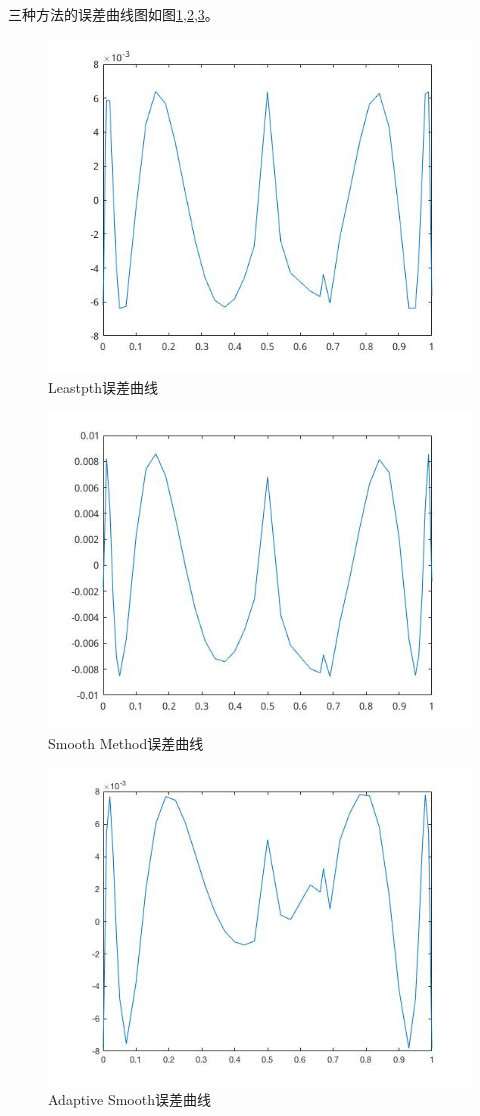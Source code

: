 \documentclass{ctexart}
\begin{document}
三种方法的误差曲线图如图\ref{fig:leastpth},\ref{fig:xusmooth},\ref{fig:adasmooth}。
\begin{figure}[htpb]
	\centering
	\includegraphics[width=0.8\linewidth]{pic/leastpth.jpg}
	\caption{Leastpth误差曲线}
	\label{fig:leastpth}
\end{figure}
\begin{figure}[htpb]
	\centering
	\includegraphics[width=0.8\linewidth]{pic/xusmooth.jpg}
	\caption{Smooth Method误差曲线}
	\label{fig:xusmooth}
\end{figure}
\begin{figure}[htpb]
	\centering
	\includegraphics[width=0.8\linewidth]{pic/adasmooth.jpg}
	\caption{Adaptive Smooth误差曲线}
	\label{fig:adasmooth}
\end{figure}
\end{document}
